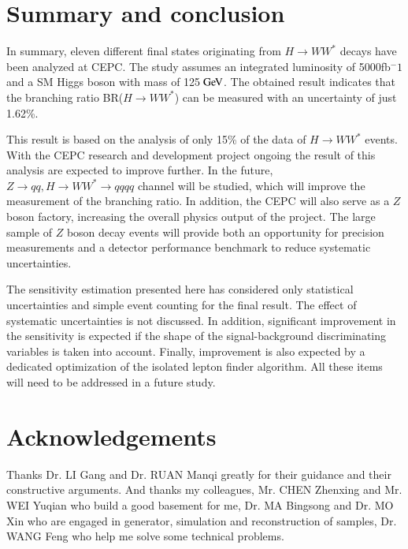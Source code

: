 \documentclass[11pt,a4paper]{cepcnote}
\begin{document}
%
%
\section{Summary and conclusion}
In summary, eleven different final states originating from 
$H\rightarrow WW^*$ decays have been analyzed at CEPC. The study assumes 
an integrated luminosity of 5000fb$^-1$ and a SM Higgs boson with mass 
of 125$\gev$. The obtained result indicates that the branching ratio 
BR($H\rightarrow WW^*$) can be measured with an uncertainty of just 1.62\%.

This result is based on the analysis of only 15\% of the data {\color{blue} of $H\to WW^*$ events.} 
With the CEPC research and development project ongoing
the result of this analysis are expected to improve further.
In the future, $Z\rightarrow qq, H\rightarrow WW^*\rightarrow qqqq$ channel 
will be studied, which will improve the measurement of the branching ratio.
In addition, the CEPC will also serve as a $Z$ boson factory, increasing the
overall physics output of the project.
The large sample of $Z$ boson decay events will provide both an opportunity
for precision measurements and a detector performance benchmark to reduce 
systematic uncertainties.

The sensitivity  estimation presented here has considered only statistical
uncertainties and simple event counting for the final result.
The effect of systematic uncertainties is not discussed. In addition,
significant improvement in the sensitivity is expected 
if the shape of the signal-background
discriminating variables is taken into account. Finally, improvement is
also expected by a dedicated optimization of the isolated lepton finder
algorithm. All these items will need to be addressed in a future study.

%

\section{Acknowledgements}

Thanks Dr. LI Gang and Dr. RUAN Manqi greatly for their guidance and their constructive arguments.
And thanks my colleagues, Mr. CHEN Zhenxing and Mr. WEI Yuqian who build a good basement for me, 
Dr. MA Bingsong and Dr. MO Xin who are engaged in generator, simulation and reconstruction of samples, 
Dr. WANG Feng who help me solve some technical problems.
\end{document}
